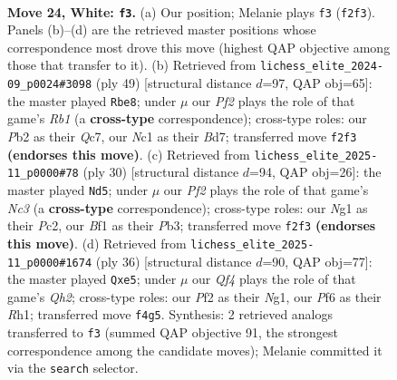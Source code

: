 \documentclass[11pt]{article}
\begin{document}
\begin{figure}[p]
\label{fig:thought-m44}
\end{figure}

\clearpage

\begin{figure}[p]\centering
\begin{subfigure}{0.46\textwidth}\centering
\resizebox{\linewidth}{!}{%
\newchessgame
\chessboard[
  setfen={r1b1rk2/3q3p/ppn1pPp1/2p5/P2p1Q2/2P5/1P3PPP/1KN1RBNR w - - 1 24},
  showmover=false,
  pgfstyle=straightmove, color=movearrow, markmove={f2-f3}
]}
\caption{}
\end{subfigure}\hfill
\begin{subfigure}{0.46\textwidth}\centering
\resizebox{\linewidth}{!}{%
\newchessgame
\chessboard[
  setfen={1r4k1/2qbrp1n/pn1p2pp/N2PP3/2pQ1P2/2N1RB1P/1P4P1/5RK1 b - - 0 25},
  showmover=false,
  pgfstyle=straightmove, color=movearrow, markmove={b8-e8}
]}
\caption{}
\end{subfigure}
\\[4pt]
\begin{subfigure}{0.46\textwidth}\centering
\resizebox{\linewidth}{!}{%
\newchessgame
\chessboard[
  setfen={r1b1qrk1/1p2bppp/p2p4/4p1PQ/3BP3/1PN3R1/1PP2P1P/R3K3 w Q - 0 16},
  showmover=false,
  pgfstyle=straightmove, color=movearrow, markmove={c3-d5}
]}
\caption{}
\end{subfigure}\hfill
\begin{subfigure}{0.46\textwidth}\centering
\resizebox{\linewidth}{!}{%
\newchessgame
\chessboard[
  setfen={r1bq1rk1/5p2/p7/2ppnN2/1p2n1Pp/4P3/PPP4Q/1K1R1BNR w - - 0 19},
  showmover=false,
  pgfstyle=straightmove, color=movearrow, markmove={h2-e5}
]}
\caption{}
\end{subfigure}
\caption{\textbf{Move 24, White: \texttt{f3}.} (a) Our position; Melanie plays \texttt{f3} (\texttt{f2f3}). Panels (b)--(d) are the retrieved master positions whose correspondence most drove this move (highest QAP objective among those that transfer to it). (b) Retrieved from \texttt{lichess\_elite\_2024-09\_p0024\#3098} (ply 49) [structural distance $d$=97, QAP obj=65]: the master played \texttt{Rbe8}; under $\mu$ our \emph{Pf2} plays the role of that game's \emph{Rb1} (a \textbf{cross-type} correspondence); cross-type roles: our \emph{P}b2 as their \emph{Q}c7, our \emph{N}c1 as their \emph{B}d7; transferred move \texttt{f2f3} \textbf{(endorses this move)}. (c) Retrieved from \texttt{lichess\_elite\_2025-11\_p0000\#78} (ply 30) [structural distance $d$=94, QAP obj=26]: the master played \texttt{Nd5}; under $\mu$ our \emph{Pf2} plays the role of that game's \emph{Nc3} (a \textbf{cross-type} correspondence); cross-type roles: our \emph{N}g1 as their \emph{P}c2, our \emph{B}f1 as their \emph{P}b3; transferred move \texttt{f2f3} \textbf{(endorses this move)}. (d) Retrieved from \texttt{lichess\_elite\_2025-11\_p0000\#1674} (ply 36) [structural distance $d$=90, QAP obj=77]: the master played \texttt{Qxe5}; under $\mu$ our \emph{Qf4} plays the role of that game's \emph{Qh2}; cross-type roles: our \emph{P}f2 as their \emph{N}g1, our \emph{P}f6 as their \emph{R}h1; transferred move \texttt{f4g5}. Synthesis: 2 retrieved analogs transferred to \texttt{f3} (summed QAP objective 91, the strongest correspondence among the candidate moves); Melanie committed it via the \texttt{search} selector.}

\end{figure}
\end{document}
